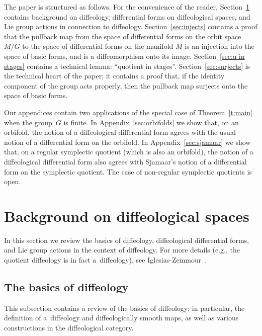 \documentclass[pdftex]{sigma}
\numberwithin{equation}{section}
\newcommand{\hypref}[2]{{#2~\ref{#1}}}
\begin{document}
The paper is structured as follows.
For the convenience of the reader,
Section~\ref{sec:diffeology} contains background on dif\/feology, dif\/ferential forms on dif\/feological spaces, and Lie group actions in connection to dif\/feology.
Section~\ref{sec:injects} contains a proof that the pullback map
from the space of dif\/ferential forms on the orbit space $M/G$
to the space of dif\/ferential forms on the manifold $M$
is an injection into the space of basic forms, and is a dif\/feomorphism onto its image.
Section~\ref{sec:q in stages} contains a technical lemma: ``quotient
in stages''.
Section~\ref{sec:surjects} is the technical heart of the paper;
it contains a proof that, if the identity component of the group acts properly,
then the pullback map surjects onto the space of basic forms.

Our appendices contain two applications
of the special case of \hypref{t:main}{Theorem}
when the group~$G$ is f\/inite.
In Appendix~\ref{sec:orbifolds} we show that, on an orbifold,
the notion of a dif\/feological dif\/ferential form
agrees with the usual notion of a dif\/ferential form on the orbifold.
In Appendix~\ref{sec:sjamaar} we show that, on a regular symplectic quotient
(which is also an orbifold),
the notion of a dif\/feological dif\/ferential form also agrees
with Sjamaar's notion of a dif\/ferential form on the symplectic quotient.
The case of non-regular symplectic quotients is open.


\section{Background on dif\/feological spaces}\label{sec:diffeology}

In this section we review the basics of dif\/feology, dif\/feological dif\/ferential forms, and Lie group actions in the context of dif\/feology. For more details (e.g., the quotient dif\/feology is in fact a~dif\/feology), see Iglesias-Zemmour~\cite{iglesias}.

\subsection*{The basics of dif\/feology}

This subsection contains a review of the basics of dif\/feology; in particular, the def\/inition of a~dif\/feology and dif\/feologically smooth maps, as well as various constructions in the dif\/feological category.
\end{document}
